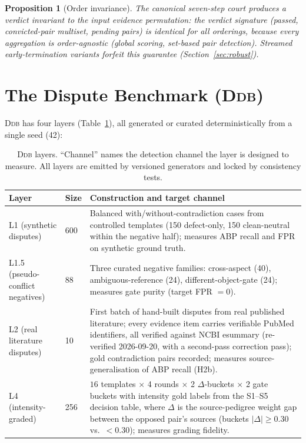 \documentclass[11pt]{article}
\newtheorem{proposition}{Proposition}
\newcommand{\ddb}{\textsc{Ddb}}
\newcommand{\Ddb}{\textsc{Ddb}}
\begin{document}
\begin{proposition}[Order invariance]\label{prop:order}
The canonical seven-step court produces a verdict invariant to the input
evidence permutation: the verdict signature
(passed, convicted-pair multiset, pending pairs) is identical for all
orderings, because every aggregation is order-agnostic (global scoring,
set-based pair detection). Streamed early-termination variants forfeit this
guarantee (Section~\ref{sec:robust}).
\end{proposition}

\section{The Dispute Benchmark (\ddb{})}\label{sec:ddb}

\Ddb{} has four layers (Table~\ref{tab:ddb}), all generated or curated
deterministically from a single seed (42):

\begin{table}[t]
\centering\small
\caption{\ddb{} layers. ``Channel'' names the detection channel the layer is
designed to measure. All layers are emitted by versioned generators and
locked by consistency tests.}
\label{tab:ddb}
\begin{tabular}{@{}llp{8.4cm}@{}}
\toprule
Layer & Size & Construction and target channel \\
\midrule
L1 (synthetic disputes) & 600 &
Balanced with/without-contradiction cases from controlled templates
(150 defect-only, 150 clean-neutral within the negative half); measures ABP
recall and FPR on synthetic ground truth. \\
L1.5 (pseudo-conflict negatives) & 88 &
Three curated negative families: cross-aspect (40), ambiguous-reference
(24), different-object-gate (24); measures gate purity (target FPR $=0$). \\
L2 (real literature disputes) & 10 &
First batch of hand-built disputes from real published literature; every
evidence item carries verifiable PubMed identifiers, all verified against
NCBI esummary (re-verified 2026-09-20, with a second-pass correction pass);
gold contradiction pairs recorded; measures source-generalisation of ABP
recall (H2b). \\
L4 (intensity-graded) & 256 &
$16$ templates $\times$ 4 rounds $\times$ 2 $\Delta$-buckets $\times$ 2 gate
buckets with intensity gold labels from the S1--S5 decision table, where
$\Delta$ is the source-pedigree weight gap between the opposed pair's
sources (buckets $|\Delta| \ge 0.30$ vs.\ $< 0.30$); measures
grading fidelity. \\
\bottomrule
\end{tabular}
\end{table}
\end{document}
